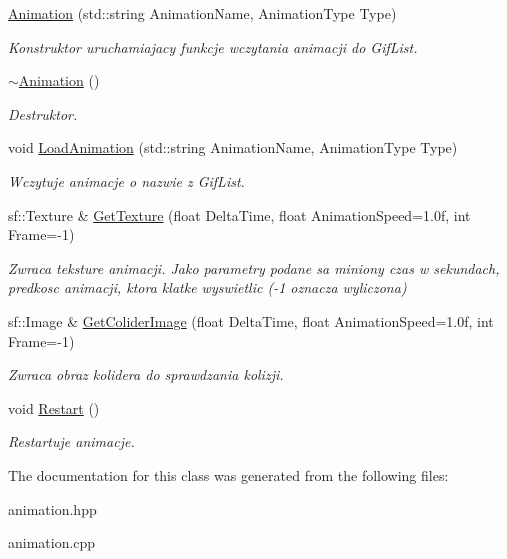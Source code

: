 \begin{DoxyCompactItemize}
\mbox{\hyperlink{classtfp_1_1_animation_ae4effa49553ca4b1a40926e333713efe}{Animation}} (std\+::string Animation\+Name, Animation\+Type Type)
\begin{DoxyCompactList}\small\item\em Konstruktor uruchamiajacy funkcje wczytania animacji do Gif\+List. \end{DoxyCompactList}\item 
\mbox{\label{classtfp_1_1_animation_a76e1adadb809791647dd94cbe6f96a93}} 
\mbox{\hyperlink{classtfp_1_1_animation_a76e1adadb809791647dd94cbe6f96a93}{$\sim$\+Animation}} ()
\begin{DoxyCompactList}\small\item\em Destruktor. \end{DoxyCompactList}\item 
\mbox{\label{classtfp_1_1_animation_ab77e7c5225657cdda6b0c9fba49168fb}} 
void \mbox{\hyperlink{classtfp_1_1_animation_ab77e7c5225657cdda6b0c9fba49168fb}{Load\+Animation}} (std\+::string Animation\+Name, Animation\+Type Type)
\begin{DoxyCompactList}\small\item\em Wczytuje animacje o nazwie z Gif\+List. \end{DoxyCompactList}\item 
\mbox{\label{classtfp_1_1_animation_a5f5719838392da69c4dd50b3d5195aec}} 
sf\+::\+Texture \& \mbox{\hyperlink{classtfp_1_1_animation_a5f5719838392da69c4dd50b3d5195aec}{Get\+Texture}} (float Delta\+Time, float Animation\+Speed=1.\+0f, int Frame=-\/1)
\begin{DoxyCompactList}\small\item\em Zwraca teksture animacji. Jako parametry podane sa miniony czas w sekundach, predkosc animacji, ktora klatke wyswietlic (-\/1 oznacza wyliczona) \end{DoxyCompactList}\item 
\mbox{\label{classtfp_1_1_animation_a565246c3b670790b8dda399f93fed707}} 
sf\+::\+Image \& \mbox{\hyperlink{classtfp_1_1_animation_a565246c3b670790b8dda399f93fed707}{Get\+Colider\+Image}} (float Delta\+Time, float Animation\+Speed=1.\+0f, int Frame=-\/1)
\begin{DoxyCompactList}\small\item\em Zwraca obraz kolidera do sprawdzania kolizji. \end{DoxyCompactList}\item 
\mbox{\label{classtfp_1_1_animation_a4fdc8748e4ea1c7a44a80b971a41676b}} 
void \mbox{\hyperlink{classtfp_1_1_animation_a4fdc8748e4ea1c7a44a80b971a41676b}{Restart}} ()
\begin{DoxyCompactList}\small\item\em Restartuje animacje. \end{DoxyCompactList}\end{DoxyCompactItemize}


The documentation for this class was generated from the following files\+:\begin{DoxyCompactItemize}
\item 
animation.\+hpp\item 
animation.\+cpp\end{DoxyCompactItemize}
